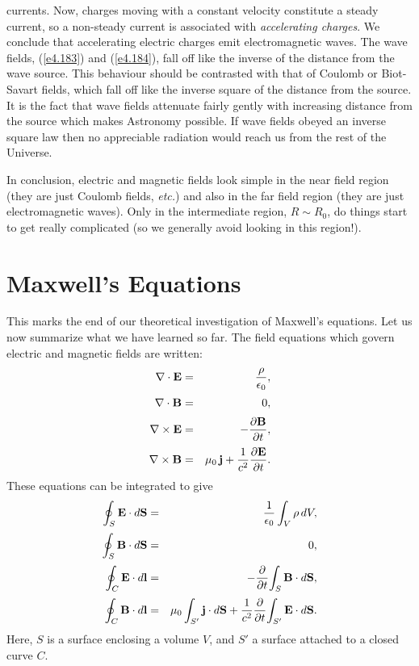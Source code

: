 currents. Now, charges moving with a constant velocity constitute a steady current, so a
non-steady current is associated with {\em accelerating charges}. We conclude that accelerating
electric charges emit electromagnetic waves. The wave fields, (\ref{e4.183}) and (\ref{e4.184}), fall off
like the inverse of the distance from the wave source. This behaviour should be contrasted with
that of  Coulomb or Biot-Savart fields, which fall off like the inverse square of
the distance from the source.  It is the fact that wave fields attenuate fairly gently with increasing
distance from the source which makes Astronomy possible. If wave fields obeyed an inverse square
law then no appreciable radiation would reach us from the rest of the Universe.

In conclusion, electric and magnetic fields look simple in the near field region (they are
just Coulomb fields, {\em etc.}) and also in the far field region (they are just electromagnetic
waves). Only in the intermediate region, $R\sim R_0$, do things start to get really complicated
(so we generally avoid looking in this region!).

\section{Maxwell's Equations}\label{s4.12}
This marks the end of our theoretical investigation of Maxwell's equations. Let us now summarize
what we have learned so far. The field equations which govern electric and magnetic fields
are written:
\begin{eqnarray}
\nabla\cdot{\bf E} &=& \frac{\rho}{\epsilon_0},\label{e4.117}\\[0.5ex]
\nabla\cdot{\bf B} &=& 0,\label{e4.118}\\[0.5ex]
\nabla\times{\bf E} &=& - \frac{\partial {\bf B}}{\partial t},\label{e4.119}\\[0.5ex]
\nabla\times{\bf B}&=& \mu_0\,{\bf j} + \frac{1}{c^2} \frac{\partial {\bf E}}{\partial t}.\label{e4.120}
\end{eqnarray}
These equations can be integrated to give
\begin{eqnarray}
\oint_S {\bf E} \cdot d{\bf S} &=& \frac{1}{\epsilon_0}\int_V \rho\,dV,\label{e4.191}\\[0.5ex]
\oint_S {\bf B}\cdot d{\bf S} &=& 0,\\[0.5ex]
\oint_C{\bf E}\cdot d{\bf l}  &=& - \frac{\partial }{\partial t}\!
\int_S {\bf B}\cdot d{\bf S},\\[0.5ex]
\oint_C{\bf B}\cdot d{\bf l} &=& \mu_0\int_{S'} {\bf j}\cdot
d{\bf S}  + \frac{1}{c^2}\frac{\partial }{\partial t}\!\int_{S'} {\bf E} \cdot d{\bf S}.\label{e4.194}
\end{eqnarray}
Here, $S$ is a surface enclosing a volume $V$, and $S'$ a surface attached
to a closed curve $C$.

